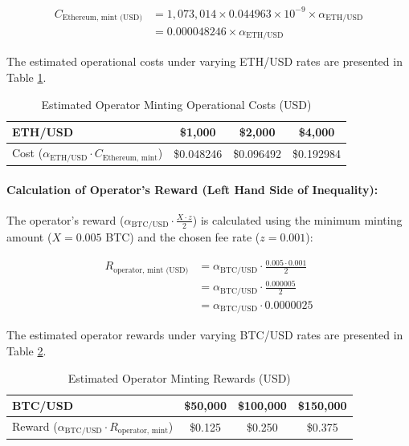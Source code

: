 \documentclass{DESSThesis}
\begin{document}
\begin{align*}
C_{\text{Ethereum, mint (USD)}} &= 1,073,014 \times 0.044963 \times 10^{-9} \times \alpha_{\text{ETH/USD}} \\
&= 0.000048246 \times \alpha_{\text{ETH/USD}}
\end{align*}

The estimated operational costs under varying ETH/USD rates are presented in Table \ref{tab:minting_cost_rhs}.

\begin{table}[h!]
\caption{Estimated Operator Minting Operational Costs (USD)}
\label{tab:minting_cost_rhs}
\centering
\begin{tabular}{|l|c|c|c|}
\hline
\textbf{ETH/USD} & \textbf{\$1,000} & \textbf{\$2,000} & \textbf{\$4,000} \\
\hline
Cost (\(\alpha_{\text{ETH/USD}} \cdot C_{\text{Ethereum, mint}}\)) & \$0.048246 & \$0.096492 & \$0.192984 \\
\hline
\end{tabular}
\end{table}

\paragraph{Calculation of Operator's Reward (Left Hand Side of Inequality):}
The operator's reward (\(\alpha_{\text{BTC/USD}} \cdot \frac{X \cdot z}{2}\)) is calculated using the minimum minting amount (\(X = 0.005\) BTC) and the chosen fee rate (\(z = 0.001\)):

\begin{align*}
R_{\text{operator, mint (USD)}} &= \alpha_{\text{BTC/USD}} \cdot \frac{0.005 \cdot 0.001}{2} \\
&= \alpha_{\text{BTC/USD}} \cdot \frac{0.000005}{2} \\
&= \alpha_{\text{BTC/USD}} \cdot 0.0000025
\end{align*}

The estimated operator rewards under varying BTC/USD rates are presented in Table \ref{tab:minting_reward_lhs}.

\begin{table}[h!]
\caption{Estimated Operator Minting Rewards (USD)}
\label{tab:minting_reward_lhs}
\centering
\begin{tabular}{|l|c|c|c|}
\hline
\textbf{BTC/USD} & \textbf{\$50,000} & \textbf{\$100,000} & \textbf{\$150,000} \\
\hline
Reward (\(\alpha_{\text{BTC/USD}} \cdot R_{\text{operator, mint}}\)) & \$0.125 & \$0.250 & \$0.375 \\
\hline
\end{tabular}
\end{table}
\end{document}
